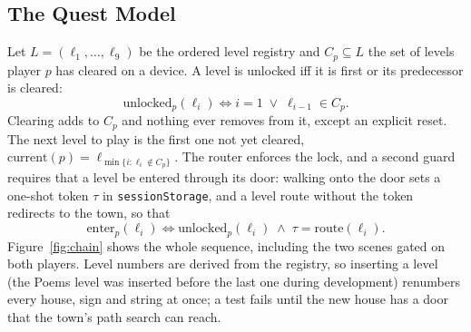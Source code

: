 \documentclass[sigconf,nonacm]{acmart}
\newcommand{\code}[1]{\textnormal{\texttt{\small #1}}}
\begin{document}
\subsection{The Quest Model}
Let $L = (\ell_1,\dots,\ell_9)$ be the ordered level registry and $C_p \subseteq L$ the set of
levels player $p$ has cleared on a device. A level is unlocked iff it is first or its predecessor
is cleared:
\begin{equation}\label{eq:unlock}
  \mathrm{unlocked}_p(\ell_i) \iff i = 1 \;\lor\; \ell_{i-1} \in C_p .
\end{equation}
Clearing adds to $C_p$ and nothing ever removes from it, except an explicit reset. The next level
to play is the first one not yet cleared, $\mathrm{current}(p) = \ell_{\min\{i : \ell_i \notin C_p\}}$.
The router enforces the lock, and a second guard requires that a level be entered through its door:
walking onto the door sets a one-shot token $\tau$ in \code{sessionStorage}, and a level route
without the token redirects to the town, so that
\begin{equation}\label{eq:enter}
  \mathrm{enter}_p(\ell_i) \iff \mathrm{unlocked}_p(\ell_i) \;\land\; \tau = \mathrm{route}(\ell_i) .
\end{equation}
Figure~\ref{fig:chain} shows the whole sequence, including the two scenes gated on both players. Level numbers are derived from the registry, so inserting a level (the
Poems level was inserted before the last one during development) renumbers every house, sign and
string at once; a test fails until the new house has a door that the town's path search can reach.
\end{document}
